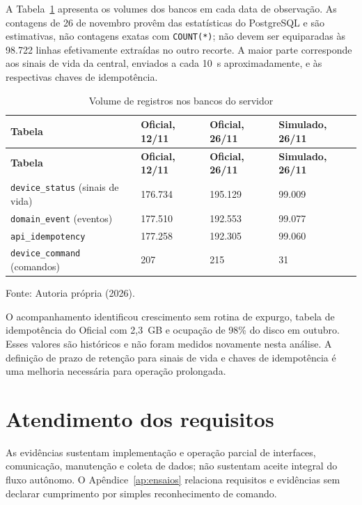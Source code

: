 A Tabela~\ref{tab:dados-volume} apresenta os volumes dos bancos em cada data de observação. As contagens de 26 de novembro provêm das estatísticas do PostgreSQL e são estimativas, não contagens exatas com \texttt{COUNT(*)}; não devem ser equiparadas às 98.722 linhas efetivamente extraídas no outro recorte. A maior parte corresponde aos sinais de vida da central, enviados a cada 10~s aproximadamente, e às respectivas chaves de idempotência.

{\small\setlength{\tabcolsep}{3pt}\begin{longtable}{p{}p{}p{}p{}}
\caption{Volume de registros nos bancos do servidor}\label{tab:dados-volume}\\
\hline\textbf{Tabela} & \textbf{Oficial, 12/11} & \textbf{Oficial, 26/11} & \textbf{Simulado, 26/11}\\\hline\endfirsthead
\hline\textbf{Tabela} & \textbf{Oficial, 12/11} & \textbf{Oficial, 26/11} & \textbf{Simulado, 26/11}\\\hline\endhead
\texttt{device\_status} (sinais de vida) & 176.734 & 195.129 & 99.009\\\hline
\texttt{domain\_event} (eventos) & 177.510 & 192.553 & 99.077\\\hline
\texttt{api\_idempotency} & 177.258 & 192.305 & 99.060\\\hline
\texttt{device\_command} (comandos) & 207 & 215 & 31\\\hline
\end{longtable}}{\small\noindent Fonte: Autoria própria (2026).\par}

O acompanhamento identificou crescimento sem rotina de expurgo, tabela de idempotência do Oficial com 2,3~GB e ocupação de 98\% do disco em outubro. Esses valores são históricos e não foram medidos novamente nesta análise. A definição de prazo de retenção para sinais de vida e chaves de idempotência é uma melhoria necessária para operação prolongada.


\section{Atendimento dos requisitos}
As evidências sustentam implementação e operação parcial de interfaces, comunicação, manutenção e coleta de dados; não sustentam aceite integral do fluxo autônomo. O Apêndice~\ref{ap:ensaios} relaciona requisitos e evidências sem declarar cumprimento por simples reconhecimento de comando.
